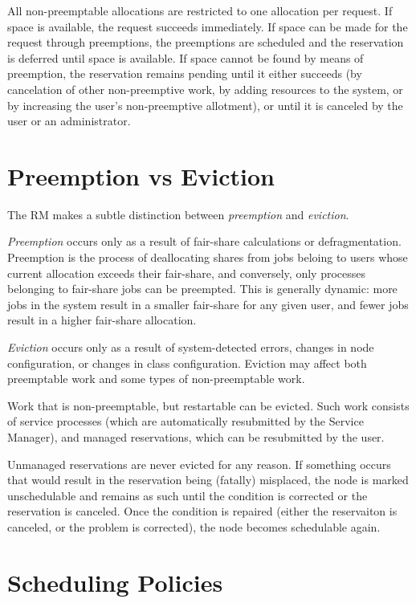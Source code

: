     All non-preemptable allocations are restricted to one allocation per request.  If space is
    available, the request succeeds immediately.  If space can be made for the request through
    preemptions, the preemptions are scheduled and the reservation is deferred until space
    is available.  If space cannot be found by means of preemption, the reservation remains
    pending until it either succeeds (by cancelation of other non-preemptive work, by
    adding resources to the system, or by increasing the user's non-preemptive allotment), or until
    it is canceled by the user or an administrator.

    \section{Preemption vs Eviction}
    The RM makes a subtle distinction between {\em preemption} and {\em eviction}.

    {\em Preemption} occurs only as a result of fair-share
    calculations or defragmentation.  Preemption is the process of
    deallocating shares from jobs beloing to users whose current
    allocation exceeds their fair-share, and conversely, only processes
    belonging to fair-share jobs can be preempted. This is generally 
    dynamic: more jobs in the system result in a smaller fair-share
    for any given user, and fewer jobs result in a higher fair-share
    allocation.

    {\em Eviction} occurs only as a result of system-detected errors,
    changes in node configuration, or changes in class
    configuration. Eviction may affect both preemptable work and some
    types of non-preemptable work.

    Work that is non-preemptable, but restartable can be evicted.  Such work consists of service
    processes (which are automatically resubmitted by the Service Manager), and managed reservations,
    which can be resubmitted by the user.

    Unmanaged reservations are never evicted for any reason.  If something occurs that
    would result in the reservation being (fatally) misplaced, the node is marked
    unschedulable and remains as such until the condition is corrected or the reservation
    is canceled.  Once the condition is repaired (either the reservaiton is canceled, or
    the problem is corrected), the node becomes schedulable again.

    \section{Scheduling Policies}

